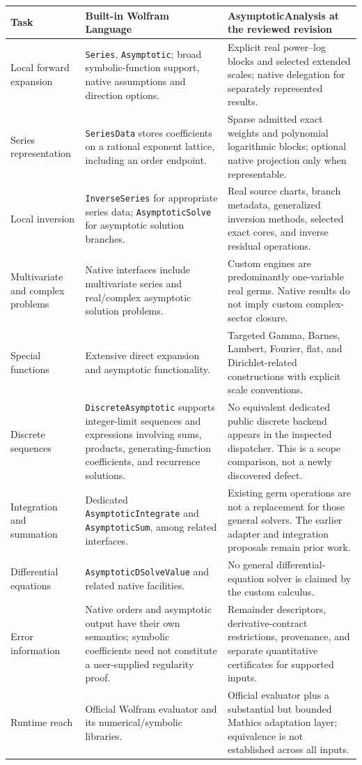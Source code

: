 \documentclass[11pt,a4paper]{article}
\newcommand{\code}[1]{\texttt{#1}}
\begin{document}
\begin{longtable}{@{}L{0.19\textwidth}L{0.365\textwidth}L{0.365\textwidth}@{}}
\toprule
Task & Built-in Wolfram Language & AsymptoticAnalysis at the reviewed revision\\
\midrule
\endhead
Local forward expansion & \code{Series}, \code{Asymptotic}; broad symbolic-function support, native assumptions and direction options. & Explicit real power--log blocks and selected extended scales; native delegation for separately represented results.\\
Series representation & \code{SeriesData} stores coefficients on a rational exponent lattice, including an order endpoint. & Sparse admitted exact weights and polynomial logarithmic blocks; optional native projection only when representable.\\
Local inversion & \code{InverseSeries} for appropriate series data; \code{AsymptoticSolve} for asymptotic solution branches. & Real source charts, branch metadata, generalized inversion methods, selected exact cores, and inverse residual operations.\\
Multivariate and complex problems & Native interfaces include multivariate series and real/complex asymptotic solution problems. & Custom engines are predominantly one-variable real germs. Native results do not imply custom complex-sector closure.\\
Special functions & Extensive direct expansion and asymptotic functionality. & Targeted Gamma, Barnes, Lambert, Fourier, flat, and Dirichlet-related constructions with explicit scale conventions.\\
Discrete sequences & \code{DiscreteAsymptotic} supports integer-limit sequences and expressions involving sums, products, generating-function coefficients, and recurrence solutions. & No equivalent dedicated public discrete backend appears in the inspected dispatcher. This is a scope comparison, not a newly discovered defect.\\
Integration and summation & Dedicated \code{AsymptoticIntegrate} and \code{AsymptoticSum}, among related interfaces. & Existing germ operations are not a replacement for those general solvers. The earlier adapter and integration proposals remain prior work.\\
Differential equations & \code{AsymptoticDSolveValue} and related native facilities. & No general differential-equation solver is claimed by the custom calculus.\\
Error information & Native orders and asymptotic output have their own semantics; symbolic coefficients need not constitute a user-supplied regularity proof. & Remainder descriptors, derivative-contract restrictions, provenance, and separate quantitative certificates for supported inputs.\\
Runtime reach & Official Wolfram evaluator and its numerical/symbolic libraries. & Official evaluator plus a substantial but bounded Mathics adaptation layer; equivalence is not established across all inputs.\\
\bottomrule
\end{longtable}
\end{document}
